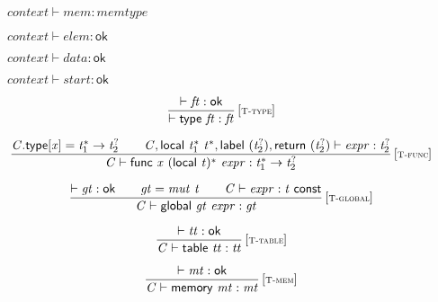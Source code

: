 $\boxed{{\mathit{context}} \vdash {\mathit{mem}} : {\mathit{memtype}}}$

$\boxed{{\mathit{context}} \vdash {\mathit{elem}} : \mathsf{ok}}$

$\boxed{{\mathit{context}} \vdash {\mathit{data}} : \mathsf{ok}}$

$\boxed{{\mathit{context}} \vdash {\mathit{start}} : \mathsf{ok}}$

\vspace{1ex}

$$
\begin{array}{@{}c@{}}\displaystyle
\frac{
{ \vdash }\;{\mathit{ft}} : \mathsf{ok}
}{
{ \vdash }\;\mathsf{type}~{\mathit{ft}} : {\mathit{ft}}
} \, {[\textsc{\scriptsize T{-}type}]}
\qquad
\end{array}
$$

$$
\begin{array}{@{}c@{}}\displaystyle
\frac{
{\mathit{C}}.\mathsf{type}[{\mathit{x}}] = {{\mathit{t}}_{{1}}^\ast} \rightarrow {{\mathit{t}}_{{2}}^?}
 \qquad
{\mathit{C}}, \mathsf{local}~{{\mathit{t}}_{{1}}^\ast}~{{\mathit{t}}^\ast}, \mathsf{label}~({{\mathit{t}}_{{2}}^?}), \mathsf{return}~({{\mathit{t}}_{{2}}^?}) \vdash {\mathit{expr}} : {{\mathit{t}}_{{2}}^?}
}{
{\mathit{C}} \vdash \mathsf{func}~{\mathit{x}}~{(\mathsf{local}~{\mathit{t}})^\ast}~{\mathit{expr}} : {{\mathit{t}}_{{1}}^\ast} \rightarrow {{\mathit{t}}_{{2}}^?}
} \, {[\textsc{\scriptsize T{-}func}]}
\qquad
\end{array}
$$

$$
\begin{array}{@{}c@{}}\displaystyle
\frac{
{ \vdash }\;{\mathit{gt}} : \mathsf{ok}
 \qquad
{\mathit{gt}} = {\mathit{mut}}~{\mathit{t}}
 \qquad
{\mathit{C}} \vdash {\mathit{expr}} : {\mathit{t}}~\mathsf{const}
}{
{\mathit{C}} \vdash \mathsf{global}~{\mathit{gt}}~{\mathit{expr}} : {\mathit{gt}}
} \, {[\textsc{\scriptsize T{-}global}]}
\qquad
\end{array}
$$

$$
\begin{array}{@{}c@{}}\displaystyle
\frac{
{ \vdash }\;{\mathit{tt}} : \mathsf{ok}
}{
{\mathit{C}} \vdash \mathsf{table}~{\mathit{tt}} : {\mathit{tt}}
} \, {[\textsc{\scriptsize T{-}table}]}
\qquad
\end{array}
$$

$$
\begin{array}{@{}c@{}}\displaystyle
\frac{
{ \vdash }\;{\mathit{mt}} : \mathsf{ok}
}{
{\mathit{C}} \vdash \mathsf{memory}~{\mathit{mt}} : {\mathit{mt}}
} \, {[\textsc{\scriptsize T{-}mem}]}
\qquad
\end{array}
$$

